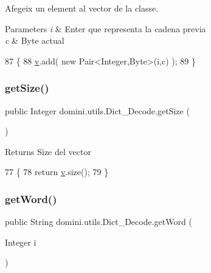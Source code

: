 Afegeix un element al vector de la classe. 


\begin{DoxyParams}{Parameters}
{\em i} & Enter que representa la cadena previa \\
\hline
{\em c} & Byte actual \\
\hline
\end{DoxyParams}

\begin{DoxyCode}
87                                        \{
88         \hyperlink{classdomini_1_1utils_1_1Dict__Decode_a351bb8836b391e5e21ebc9cc1943a22d}{v}.add( \textcolor{keyword}{new} Pair<Integer,Byte>(i,c) );
89     \}
\end{DoxyCode}
\mbox{\label{classdomini_1_1utils_1_1Dict__Decode_aac69020c3515649e8c2d70e2908e3f3e}} 
\subsubsection{\texorpdfstring{get\+Size()}{getSize()}}
{\footnotesize\ttfamily public Integer domini.\+utils.\+Dict\+\_\+\+Decode.\+get\+Size (\begin{DoxyParamCaption}{ }\end{DoxyParamCaption})\hspace{0.3cm}{\ttfamily [inline]}}

\begin{DoxyReturn}{Returns}
Size del vector 
\end{DoxyReturn}

\begin{DoxyCode}
77                              \{
78         \textcolor{keywordflow}{return} \hyperlink{classdomini_1_1utils_1_1Dict__Decode_a351bb8836b391e5e21ebc9cc1943a22d}{v}.size();
79     \}
\end{DoxyCode}
\mbox{\label{classdomini_1_1utils_1_1Dict__Decode_a0f6457460aefe9df50f0cad48f58feee}} 
\subsubsection{\texorpdfstring{get\+Word()}{getWord()}}
{\footnotesize\ttfamily public String domini.\+utils.\+Dict\+\_\+\+Decode.\+get\+Word (\begin{DoxyParamCaption}\item[{Integer}]{i }\end{DoxyParamCaption})\hspace{0.3cm}{\ttfamily [inline]}}




